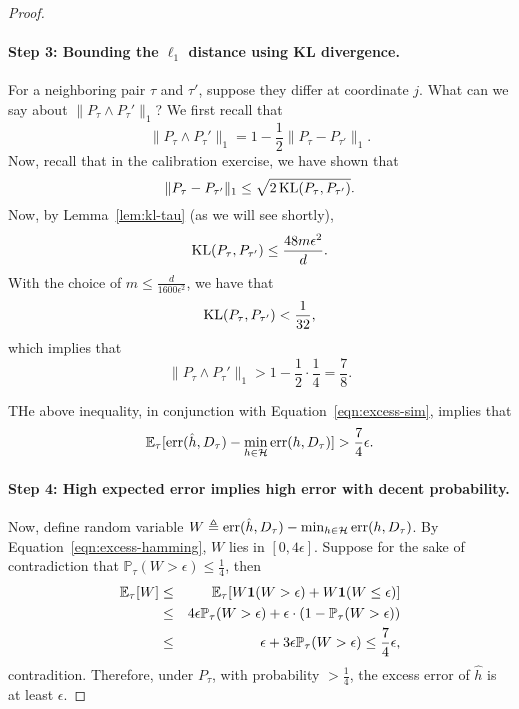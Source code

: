 \documentclass{article}
\DeclareMathOperator*{\KL}{{\rm KL}}
\DeclareMathOperator*{\err}{{\rm err}}
\newcommand{\EE}{\mathbb{E}}
\newcommand{\PP}{\mathbb{P}}
\newcommand{\Hcal}{\mathcal{H}}
\newcommand{\defeq}{\triangleq}
\newcommand*{\one}{{\bf 1}}
\begin{document}
\begin{proof}
\paragraph{Step 3: Bounding the $\ell_1$ distance using KL divergence.}
For a neighboring pair $\tau$ and $\tau'$, suppose they differ at coordinate $j$.
What can we say about $\| P_\tau \wedge P_\tau' \|_1$? We first recall that
\[ \| P_\tau \wedge P_\tau' \|_1 = 1 - \frac12 \| P_{\tau} - P_{\tau'} \|_1. \]
Now, recall that in the calibration exercise, we have shown that
\[ \| P_{\tau} - P_{\tau'} \|_1 \leq \sqrt{2 \KL(P_{\tau}, P_{\tau'})}. \]
Now, by Lemma~\ref{lem:kl-tau} (as we will see shortly),
\[ \KL(P_{\tau}, P_{\tau'}) \leq \frac{48 m \epsilon^2}{d}. \]
With the choice of $m \leq \frac{d}{1600\epsilon^2}$, we have that
\[ \KL(P_{\tau}, P_{\tau'}) < \frac{1}{32}, \]
which implies that
\[ \| P_\tau \wedge P_\tau' \|_1 > 1 - \frac12 \cdot \frac14 = \frac 78. \]

THe above inequality, in conjunction with Equation~\eqref{eqn:excess-sim}, implies that
\begin{equation}
  \EE_\tau[\err(\hat{h}, D_\tau) - \min_{h \in \Hcal} \err(h, D_\tau)] > \frac 74 \epsilon.
  \label{eqn:exp-err-ub}
\end{equation}

\paragraph{Step 4: High expected error implies high error with decent probability.} Now, define random variable $W \defeq \err(\hat{h}, D_\tau) - \min_{h \in \Hcal} \err(h, D_\tau)$. By Equation~\eqref{eqn:excess-hamming}, $W$ lies in $[0, 4\epsilon]$. Suppose for the sake of contradiction that $\PP_\tau(W > \epsilon) \leq \frac 1 4$,
then
\begin{eqnarray*}
  \EE_\tau[W]
  &\leq& \EE_\tau[W \one(W > \epsilon) + W \one(W \leq \epsilon)] \\
  &\leq& 4 \epsilon \PP_\tau(W > \epsilon) + \epsilon \cdot (1-\PP_\tau(W > \epsilon)) \\
  &\leq& \epsilon + 3 \epsilon \PP_\tau(W > \epsilon) \leq \frac 7 4 \epsilon,
\end{eqnarray*}
contradition. Therefore, under $P_\tau$, with probability $> \frac 1 4$,
the excess error of $\hat{h}$ is at least $\epsilon$.
\end{proof}
\end{document}
